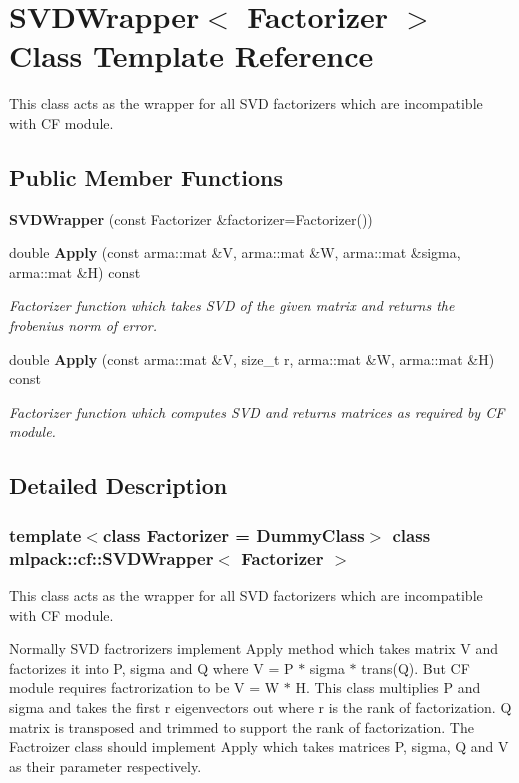 \section{S\+V\+D\+Wrapper$<$ Factorizer $>$ Class Template Reference}
\label{classmlpack_1_1cf_1_1SVDWrapper}


This class acts as the wrapper for all S\+VD factorizers which are incompatible with CF module.  


\subsection*{Public Member Functions}
\begin{DoxyCompactItemize}
\item 
\textbf{ S\+V\+D\+Wrapper} (const Factorizer \&factorizer=Factorizer())
\item 
double \textbf{ Apply} (const arma\+::mat \&V, arma\+::mat \&W, arma\+::mat \&sigma, arma\+::mat \&H) const
\begin{DoxyCompactList}\small\item\em Factorizer function which takes S\+VD of the given matrix and returns the frobenius norm of error. \end{DoxyCompactList}\item 
double \textbf{ Apply} (const arma\+::mat \&V, size\+\_\+t r, arma\+::mat \&W, arma\+::mat \&H) const
\begin{DoxyCompactList}\small\item\em Factorizer function which computes S\+VD and returns matrices as required by CF module. \end{DoxyCompactList}\end{DoxyCompactItemize}


\subsection{Detailed Description}
\subsubsection*{template$<$class Factorizer = Dummy\+Class$>$\newline
class mlpack\+::cf\+::\+S\+V\+D\+Wrapper$<$ Factorizer $>$}

This class acts as the wrapper for all S\+VD factorizers which are incompatible with CF module. 

Normally S\+VD factrorizers implement Apply method which takes matrix V and factorizes it into P, sigma and Q where V = P $\ast$ sigma $\ast$ trans(\+Q). But CF module requires factrorization to be V = W $\ast$ H. This class multiplies P and sigma and takes the first \textquotesingle{}r\textquotesingle{} eigenvectors out where \textquotesingle{}r\textquotesingle{} is the rank of factorization. Q matrix is transposed and trimmed to support the rank of factorization. The Factroizer class should implement Apply which takes matrices P, sigma, Q and V as their parameter respectively. 

